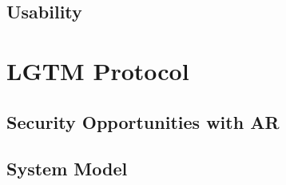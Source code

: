 \documentclass[12pt]{report}
\begin{document}
\section{Usability}


\chapter{LGTM Protocol}
\section{Security Opportunities with AR}


\section{System Model}
\end{document}
